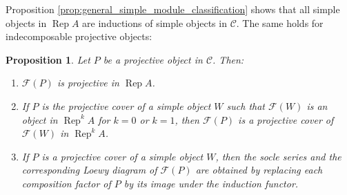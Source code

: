 \documentclass[11pt, reqno]{amsart}
\newtheorem{prop}[thm]{Proposition}
\theoremstyle{definition}\newtheorem{defi}[thm]{Definition}
\theoremstyle{definition}\newtheorem{rem}[thm]{Remark}
\theoremstyle{definition}\newtheorem{exam}[thm]{Example}
\theoremstyle{definition}\newtheorem{assum}[thm]{Assumption}
\newcommand{\cF}{\mathcal{F}}
\newcommand{\cC}{\mathcal{C}}
\DeclareMathOperator{\rep}{Rep}
\newcommand{\repA}{\rep A}
\begin{document}
Proposition \ref{prop:general_simple_module_classification} shows that all simple objects in $\repA$ are inductions of simple objects in $\cC$. The same holds for indecomposable projective objects:  
\begin{prop}\label{prop:general_proj_covers}
Let $P$ be a projective object in $\cC$. Then:
\begin{enumerate}
\item $\cF(P)$ is projective in $\repA$.
\item If $P$ is the projective cover of a simple object $W$ such that $\cF(W)$ is an object in $\rep^k A$ for $k=0$ or $k=1$, then $\cF(P)$ is a projective cover of $\cF(W)$ in $\rep^k A$.
\item If $P$ is a projective cover of a simple object $W$, then the socle series and the corresponding Loewy diagram of $\cF(P)$ are obtained by replacing each composition factor of $P$ by its image under the induction functor. 
\end{enumerate}
\end{prop}
\end{document}
